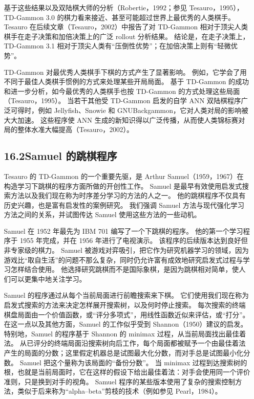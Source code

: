 \documentclass[UTF8, 12pt, fontset=fandol, oneside]{ctexart}
\begin{document}
基于这些结果以及双陆棋大师的分析（Robertie，1992；参见 Tesauro，1995），TD-Gammon 3.0 的棋力看来接近、甚至可能超过世界上最优秀的人类棋手。
Tesauro 在后续文章（Tesauro，2002）中报告了对 TD-Gammon 相对于顶尖人类棋手在走子决策和加倍决策上的广泛 rollout 分析结果。
结论是，在走子决策上，TD-Gammon 3.1 相对于顶尖人类有“压倒性优势”；在加倍决策上则有“轻微优势”。

TD-Gammon 对最优秀人类棋手下棋的方式产生了显著影响。
例如，它学会了用不同于最佳人类棋手惯例的方式来处理某些开局局面。
基于 TD-Gammon 的成功和进一步分析，如今最优秀的人类棋手也按 TD-Gammon 的方式处理这些局面（Tesauro，1995）。
当若干其他受 TD-Gammon 启发的自学 ANN 双陆棋程序广泛可得时，例如 Jellyfish、Snowie 和 GNUBackgammon，它对人类对局的影响被大大加速。
这些程序使 ANN 生成的新知识得以广泛传播，从而使人类锦标赛对局的整体水准大幅提高（Tesauro，2002）。

\subsection*{16.2\quad Samuel 的跳棋程序}

Tesauro 的 TD-Gammon 的一个重要先驱，是 Arthur Samuel（1959，1967）在构造学习下跳棋的程序方面所做的开创性工作。
Samuel 是最早有效使用启发式搜索方法以及我们现在称为时序差分学习的方法的人之一。
他的跳棋程序不仅具有历史兴趣，也是富有启发性的案例研究。
我们强调 Samuel 方法与现代强化学习方法之间的关系，并试图传达 Samuel 使用这些方法的一些动机。

Samuel 在 1952 年最先为 IBM 701 编写了一个下跳棋的程序。
他的第一个学习程序于 1955 年完成，并在 1956 年进行了电视演示。
该程序的后续版本达到良好但非专家级的棋力。
Samuel 被游戏对弈吸引，把它作为研究机器学习的领域，因为游戏比“取自生活”的问题不那么复杂，同时仍允许富有成效地研究启发式过程与学习怎样结合使用。
他选择研究跳棋而不是国际象棋，是因为跳棋相对简单，使人们可以更集中地关注学习。

Samuel 的程序通过从每个当前局面进行前瞻搜索来下棋。
它们使用我们现在称为启发式搜索的方法来决定怎样展开搜索树，以及何时停止搜索。
每次搜索的终端棋盘局面由一个价值函数，或“评分多项式”，用线性函数近似来评估，或“打分”。
在这一点以及其他方面，Samuel 的工作似乎受到 Shannon（1950）建议的启发。
特别地，Samuel 的程序基于 Shannon 的 minimax 过程，从当前局面找出最佳着法。
从已评分的终端局面沿搜索树向后工作，每个局面都被赋予一个由最佳着法产生的局面的分数；这里假定机器总是试图最大化分数，而对手总是试图最小化分数。
Samuel 把这个量称为该局面的“备份分数”。
当 minimax 过程到达搜索树的根，也就是当前局面时，它在这样的假设下给出最佳着法：对手会使用同一个评价准则，只是换到对手的视角。
Samuel 程序的某些版本使用了复杂的搜索控制方法，类似于后来称为“alpha--beta”剪枝的技术（例如参见 Pearl，1984）。
\end{document}
